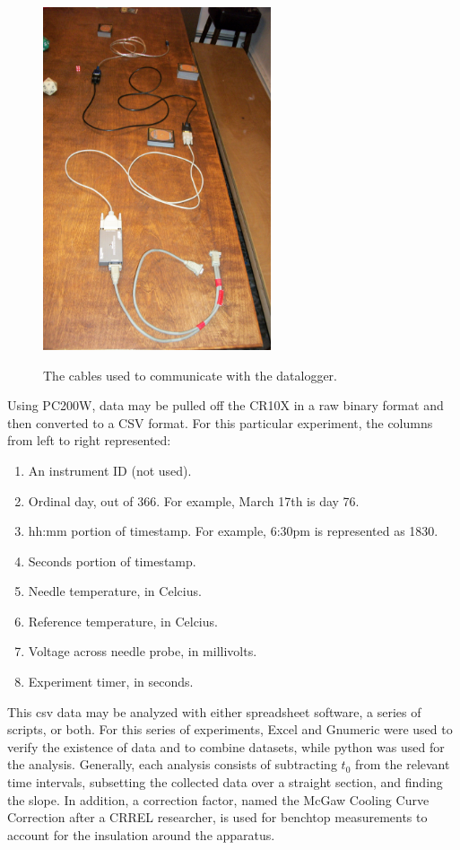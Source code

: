 \begin{figure}[h]
\centering
\includegraphics[width=0.6\textwidth]{fig/cable.jpg}
\label{fig:cable}
\caption{The cables used to communicate with the datalogger.}
\end{figure}

Using PC200W, data may be pulled off the CR10X in a raw binary format and then
converted to a CSV format. For this particular experiment, the columns from left
to right represented:

\begin{enumerate}
\item An instrument ID (not used).
\item Ordinal day, out of 366. For example, March 17th is day 76.
\item hh:mm portion of timestamp. For example, 6:30pm is represented as 1830.
\item Seconds portion of timestamp.
\item Needle temperature, in Celcius.
\item Reference temperature, in Celcius.
\item Voltage across needle probe, in millivolts.
\item Experiment timer, in seconds.
\end{enumerate}

This csv data may be analyzed with either spreadsheet software, a series of
scripts, or both. For this series of experiments, Excel and Gnumeric were used
to verify the existence of data and to combine datasets, while python was used
for the analysis.  Generally, each analysis consists of subtracting \(t_0\)
from the relevant time intervals, subsetting the collected data over a straight
section, and finding the slope.  In addition, a correction factor, named the
McGaw Cooling Curve Correction after a CRREL researcher, is used for benchtop
measurements to account for the insulation around the apparatus.

